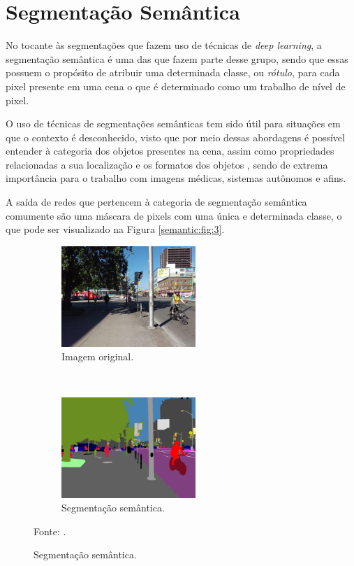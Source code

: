 \clearpage
\newpage
\section{Segmentação Semântica}
\label{semantic:semantic}
No tocante às segmentações que fazem uso de técnicas de \textit{deep learning}, a segmentação semântica é uma das que fazem parte desse grupo, sendo que essas possuem o propósito de atribuir uma determinada classe, ou \textit{rótulo}, para cada pixel presente em uma cena \cite{Wang2017, Ghosh2019, Shelhamer2016, Arbelaez2012,Zhang2018} o que é determinado como um trabalho de nível de pixel.

O uso de técnicas de segmentações semânticas tem sido útil para situações em que o contexto é desconhecido, visto que por meio dessas abordagens é possível entender à categoria dos objetos presentes na cena, assim como propriedades relacionadas a sua localização e os formatos dos objetos \cite{Zhang2018}, sendo de extrema importância para o trabalho com imagens médicas, sistemas autônomos e afins.

A saída de redes que pertencem à categoria de segmentação semântica comumente são uma máscara de 
pixels com uma única e determinada classe, o que pode ser visualizado na Figura \ref{semantic:fig:3}.

\begin{figure}[H]
   \caption{Segmentação semântica.}
   \centering
   \label{semantic:fig:3}
    \begin{subfigure}[t]{0.45\textwidth}
        \centering
        \includegraphics[height=1.5in]{recursos/imagens/semantic/t1.jpg}
        \caption{Imagem original.}
        \label{semantic:fig:3.1}
    \end{subfigure}%
    ~ 
    \begin{subfigure}[t]{0.45\textwidth}
        \centering
        \includegraphics[height=1.5in]{recursos/imagens/semantic/s1.png}
        \caption{Segmentação semântica.}
        \label{semantic:fig:3.2}
    \end{subfigure}%

    Fonte: \cite{Neuhold2017_ICCV}.
\end{figure}

